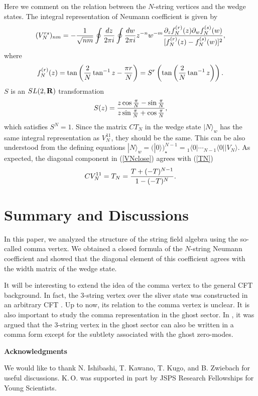 \documentclass[a4paper,12pt]{article}
\def\R{{\bf R}}
\def\o{\over}
\def\del{\partial}
\def\bra{\langle}
\def\ket{\rangle}
\def\lf{\left}
\def\ri{\right}
\def\rt#1{\sqrt{#1}}
\def\st{\star}
\begin{document}
Here we comment on the relation between the $N$-string 
vertices and the wedge states.
The integral representation of Neumann coefficient is given by
\begin{equation}
(V_N^{rs})_{nm}=-{1\o\rt{nm}}\oint {dz\o2\pi i}\oint {dw\o 2\pi i}
z^{-n}w^{-m}{\del_z f^{(r)}_N(z)\del_wf^{(s)}_N(w)
\o [f^{(r)}_N(z)-f^{(s)}_N(w)]^2}, 
\end{equation}
where
\begin{equation}
f^{(r)}_N(z)=\tan\lf({2\o N}\tan^{-1}z-{\pi r\o N}\ri)
=S^r\lf(\tan\lf({2\o N}\tan^{-1}z\ri)\ri). 
\end{equation}
$S$ is an $SL(2,\R)$ transformation
\begin{equation}
S(z)={z\cos{\pi\o N}-\sin{\pi\o N}\o z\sin{\pi\o N}+\cos{\pi\o N}},
\end{equation}
which satisfies $S^N=1$. Since the matrix $CT_N$ in the wedge state $|N\ket_w$
has the same integral representation as $V^{11}_N$, they should be the same.
This can be also understood from the defining equations
$|N\ket_w = \Big(|0\ket\Big)_{\st}^{N-1}
={}_1\bra 0| \cdots {}_{N-1}\bra 0| |V_N\ket$.
As expected, the diagonal component in (\ref{VNclose}) agrees with  (\ref{TN})
\begin{equation}
CV_N^{11}=T_N={T+(-T)^{N-1}\o 1-(-T)^N}.
\end{equation}



\section{Summary and Discussions}
In this paper, we analyzed the structure of the string field algebra
using the so-called comma vertex. We obtained a closed formula of the
$N$-string Neumann coefficient and showed that the diagonal element of
this coefficient agrees with the width matrix of
the wedge state.


It will be interesting to extend the idea of the comma vertex to
the general CFT background. In fact, the 3-string vertex over the sliver
state was constructed in an arbitrary CFT \cite{David}. Up to now,
its relation to the comma vertex is unclear.
It is also important to study the comma representation
in the ghost sector. In \cite{KosteleckyPotting}, it was argued that
the 3-string vertex in the ghost sector can also be written in a comma form
except for the subtlety associated with the ghost zero-modes.


\vskip 10mm
\centerline{\bf Acknowledgments}
We would like to thank N. Ishibashi,
T. Kawano, T. Kugo, and B. Zwiebach for useful discussions.
K.$\,$O. was supported in part by JSPS Research Fellowships for Young
Scientists.
\end{document}

